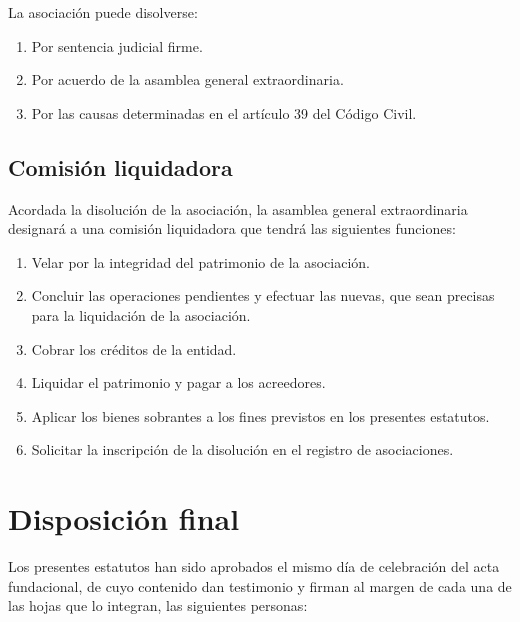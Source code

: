 \documentclass[a4paper, 12pt, oneside]{book}
\begin{document}
La asociación puede disolverse:

\begin{enumerate}
    \item Por sentencia judicial firme.  
    \item Por acuerdo de la asamblea general extraordinaria.  
    \item Por las causas determinadas en el artículo 39 del Código Civil.
\end{enumerate}

\section{Comisión liquidadora}

Acordada la disolución de la asociación, la asamblea general extraordinaria designará a una comisión liquidadora que tendrá las siguientes funciones:

\begin{enumerate}
    \item Velar por la integridad del patrimonio de la asociación.  
    \item Concluir las operaciones pendientes y efectuar las nuevas, que sean precisas para la liquidación de la asociación.  
    \item Cobrar los créditos de la entidad.  
    \item Liquidar el patrimonio y pagar a los acreedores.  
    \item Aplicar los bienes sobrantes a los fines previstos en los presentes estatutos.  
    \item Solicitar la inscripción de la disolución en el registro de asociaciones.
\end{enumerate}

\chapter*{Disposición final}

Los presentes estatutos han sido aprobados el mismo día de celebración del acta fundacional, de cuyo contenido dan testimonio y firman al margen de cada una de las hojas que lo integran, las siguientes personas:
\end{document}
